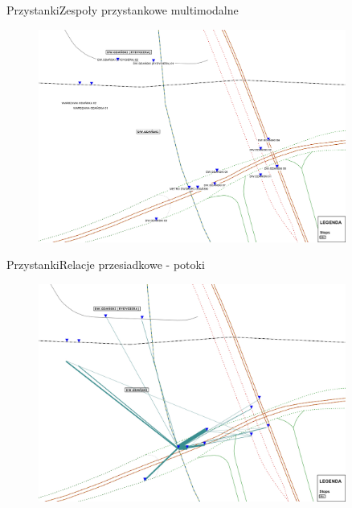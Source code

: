 \documentclass[8pt]{beamer}
\begin{document}
\begin{frame}{Przystanki}{Zespoły przystankowe multimodalne}
\begin{figure}\begin{center}
\includegraphics[width=0.9\textwidth]{multi_modal}
 \end{center}  \end{figure} 
\end{frame}

\begin{frame}{Przystanki}{Relacje przesiadkowe - potoki}
\begin{figure}\begin{center}
\includegraphics[width=0.9\textwidth]{transfers}
 \end{center}  \end{figure} 
\end{frame}
\end{document}
